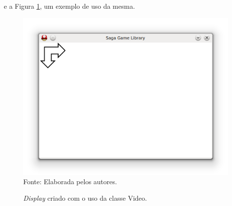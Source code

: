 %
%
e a Figura \ref{display}, um exemplo de uso da mesma.
%
%

%
%
\begin{figure}[H]
    \centering
    \caption{\textit{Display} criado com o uso da classe Video.}
    \label{display}
    \includegraphics[scale = 0.40]{Imagens/display.png}
    \\Fonte: Elaborada pelos autores.
\end{figure}
%
%
